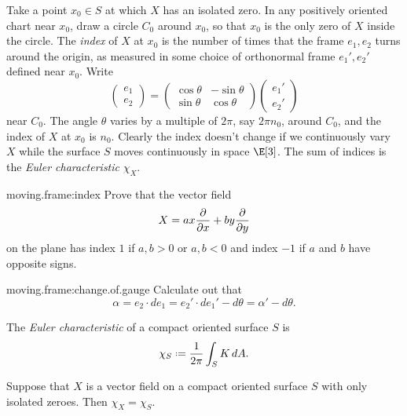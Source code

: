 Take a point \(x_0 \in S\)  at which \(X\) has an isolated zero.
In any positively oriented chart near \(x_0\), draw a circle \(C_0\) around \(x_0\), so that \(x_0\) is the only zero of \(X\) inside the circle.
The \emph{index} of \(X\) at \(x_0\) is the number of times that the frame \(e_1, e_2\) turns around the origin, as measured in some choice of orthonormal frame \(e_1', e_2'\) defined near \(x_0\).
Write
\[
\begin{pmatrix}
e_1 \\
e_2
\end{pmatrix}
=
\begin{pmatrix}
\cos \theta & -\sin \theta \\
\sin \theta & \cos \theta
\end{pmatrix}
\begin{pmatrix}
e_1' \\
e_2'
\end{pmatrix}
\]
near \(C_0\).
The angle \(\theta\) varies by a multiple of \(2\pi\), say \(2 \pi n_0\), around \(C_0\), and the index of \(X\) at \(x_0\) is \(n_0\).
Clearly the index doesn't change if we continuously vary \(X\) while the surface \(S\) moves continuously in space \(\E[3]\). 
The sum of indices is the \emph{Euler characteristic} \(\chi_X\).
\begin{problem}{moving.frame:index}
Prove that the vector field 
\[
X= a x \pderiv{}{x} + b y \pderiv{}{y}
\]
on the plane has index \(1\) if \(a,b > 0\) or \(a,b < 0\) and index \(-1\) if \(a\) and \(b\) have opposite signs.
\end{problem}
\begin{problem}{moving.frame:change.of.gauge}
Calculate out that
\[
\alpha=e_2 \cdot de_1 = e_2' \cdot de_1' - d \theta=\alpha'-d\theta.
\]
\end{problem}
The \emph{Euler characteristic} of a compact oriented surface \(S\) is 
\[
\chi_S\defeq\frac{1}{2 \pi} \int_S K \, dA.
\]
\begin{theorem}
Suppose that \(X\) is a vector field on a compact oriented surface \(S\) with only isolated zeroes. Then \(\chi_X=\chi_S\).
\end{theorem}
